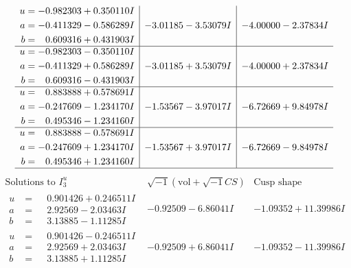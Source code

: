\documentclass[1p]{elsarticle_modified}
\theoremstyle{definition}
\newcommand{\I}{\sqrt{-1}}
\begin{document}
$$\begin{array}{c|c|c}
\begin{aligned}
u &= -0.982303 + 0.350110 I \\
a &= -0.411329 - 0.586289 I \\
b &= \phantom{-}0.609316 + 0.431903 I\end{aligned}
 & -3.01185 - 3.53079 I & -4.00000 - 2.37834 I \\ \hline\begin{aligned}
u &= -0.982303 - 0.350110 I \\
a &= -0.411329 + 0.586289 I \\
b &= \phantom{-}0.609316 - 0.431903 I\end{aligned}
 & -3.01185 + 3.53079 I & -4.00000 + 2.37834 I \\ \hline\begin{aligned}
u &= \phantom{-}0.883888 + 0.578691 I \\
a &= -0.247609 - 1.234170 I \\
b &= \phantom{-}0.495346 - 1.234160 I\end{aligned}
 & -1.53567 - 3.97017 I & -6.72669 + 9.84978 I \\ \hline\begin{aligned}
u &= \phantom{-}0.883888 - 0.578691 I \\
a &= -0.247609 + 1.234170 I \\
b &= \phantom{-}0.495346 + 1.234160 I\end{aligned}
 & -1.53567 + 3.97017 I & -6.72669 - 9.84978 I\\
 \hline 
 \end{array}$$\newpage$$\begin{array}{c|c|c}  
\text{Solutions to }I^u_{3}& \I (\text{vol} + \sqrt{-1}CS) & \text{Cusp shape}\\
 \hline 
\begin{aligned}
u &= \phantom{-}0.901426 + 0.246511 I \\
a &= \phantom{-}2.92569 - 2.03463 I \\
b &= \phantom{-}3.13885 - 1.11285 I\end{aligned}
 & -0.92509 - 6.86041 I & -1.09352 + 11.39986 I \\ \hline\begin{aligned}
u &= \phantom{-}0.901426 - 0.246511 I \\
a &= \phantom{-}2.92569 + 2.03463 I \\
b &= \phantom{-}3.13885 + 1.11285 I\end{aligned}
 & -0.92509 + 6.86041 I & -1.09352 - 11.39986 I \\ \hline\begin{aligned}

\end{aligned}
\end{array}$$
\end{document}
